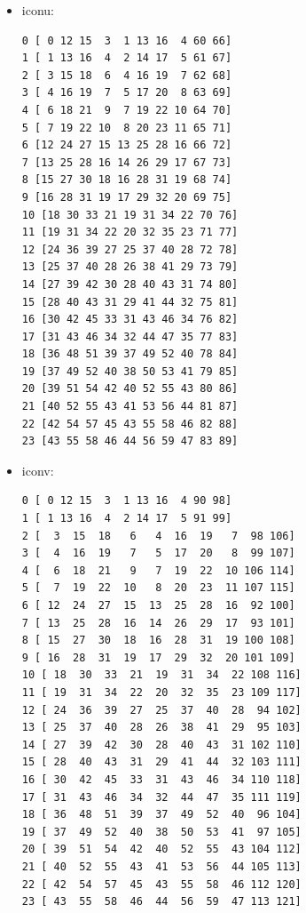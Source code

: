 \begin{itemize}
\item iconu:

\begin{verbatim}
0 [ 0 12 15  3  1 13 16  4 60 66]
1 [ 1 13 16  4  2 14 17  5 61 67]
2 [ 3 15 18  6  4 16 19  7 62 68]
3 [ 4 16 19  7  5 17 20  8 63 69]
4 [ 6 18 21  9  7 19 22 10 64 70]
5 [ 7 19 22 10  8 20 23 11 65 71]
6 [12 24 27 15 13 25 28 16 66 72]
7 [13 25 28 16 14 26 29 17 67 73]
8 [15 27 30 18 16 28 31 19 68 74]
9 [16 28 31 19 17 29 32 20 69 75]
10 [18 30 33 21 19 31 34 22 70 76]
11 [19 31 34 22 20 32 35 23 71 77]
12 [24 36 39 27 25 37 40 28 72 78]
13 [25 37 40 28 26 38 41 29 73 79]
14 [27 39 42 30 28 40 43 31 74 80]
15 [28 40 43 31 29 41 44 32 75 81]
16 [30 42 45 33 31 43 46 34 76 82]
17 [31 43 46 34 32 44 47 35 77 83]
18 [36 48 51 39 37 49 52 40 78 84]
19 [37 49 52 40 38 50 53 41 79 85]
20 [39 51 54 42 40 52 55 43 80 86]
21 [40 52 55 43 41 53 56 44 81 87]
22 [42 54 57 45 43 55 58 46 82 88]
23 [43 55 58 46 44 56 59 47 83 89]
\end{verbatim}

\item iconv:
\begin{verbatim}
0 [ 0 12 15  3  1 13 16  4 90 98]
1 [ 1 13 16  4  2 14 17  5 91 99]
2 [  3  15  18   6   4  16  19   7  98 106]
3 [  4  16  19   7   5  17  20   8  99 107]
4 [  6  18  21   9   7  19  22  10 106 114]
5 [  7  19  22  10   8  20  23  11 107 115]
6 [ 12  24  27  15  13  25  28  16  92 100]
7 [ 13  25  28  16  14  26  29  17  93 101]
8 [ 15  27  30  18  16  28  31  19 100 108]
9 [ 16  28  31  19  17  29  32  20 101 109]
10 [ 18  30  33  21  19  31  34  22 108 116]
11 [ 19  31  34  22  20  32  35  23 109 117]
12 [ 24  36  39  27  25  37  40  28  94 102]
13 [ 25  37  40  28  26  38  41  29  95 103]
14 [ 27  39  42  30  28  40  43  31 102 110]
15 [ 28  40  43  31  29  41  44  32 103 111]
16 [ 30  42  45  33  31  43  46  34 110 118]
17 [ 31  43  46  34  32  44  47  35 111 119]
18 [ 36  48  51  39  37  49  52  40  96 104]
19 [ 37  49  52  40  38  50  53  41  97 105]
20 [ 39  51  54  42  40  52  55  43 104 112]
21 [ 40  52  55  43  41  53  56  44 105 113]
22 [ 42  54  57  45  43  55  58  46 112 120]
23 [ 43  55  58  46  44  56  59  47 113 121]
\end{verbatim}


\end{itemize}

